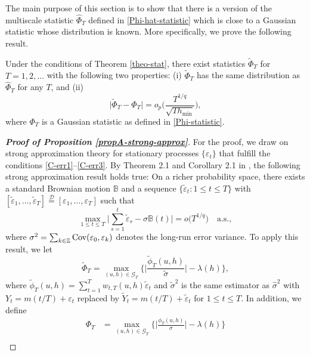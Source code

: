 \documentclass[a4paper,12pt]{article}
\numberwithin{equation}{section}
\begin{document}
The main purpose of this section is to show that there is a version of the multiscale statistic $\widehat{\Phi}_T$ defined in \eqref{Phi-hat-statistic} which is close to a Gaussian statistic whose distribution is known. More specifically, we prove the following result. 
%
%
\begin{propA}\label{propA-strong-approx}
Under the conditions of Theorem \ref{theo-stat}, there exist statistics $\widetilde{\Phi}_T$ for $T = 1,2,\ldots$ with the following two properties: (i) $\widetilde{\Phi}_T$ has the same distribution as $\widehat{\Phi}_T$ for any $T$, and (ii)
\[ \big| \widetilde{\Phi}_T - \Phi_T \big| = o_p \Big( \frac{T^{1/q}}{\sqrt{T h_{\min}}} \Big), \]
where $\Phi_T$ is a Gaussian statistic as defined in \eqref{Phi-statistic}. 
\end{propA}
%
%
\begin{proof}[\textnormal{\textbf{Proof of Proposition \ref{propA-strong-approx}}}] 
For the proof, we draw on strong approximation theory for stationary processes $\{\varepsilon_t\}$ that fulfill the conditions \ref{C-err1}--\ref{C-err3}. By Theorem 2.1 and Corollary 2.1 in \cite{BerkesLiuWu2014}, the following strong approximation result holds true: On a richer probability space, there exists a standard Brownian motion $\mathbb{B}$ and a sequence $\{ \widetilde{\varepsilon}_t: 1 \le t \le T \}$ with $[\widetilde{\varepsilon}_1,\ldots,\widetilde{\varepsilon}_T] \stackrel{\mathcal{D}}{=} [\varepsilon_1,\ldots,\varepsilon_T]$ such that 
\begin{equation}\label{eq-strongapprox-dep}
\max_{1 \le t \le T} \Big| \sum\limits_{s=1}^t \widetilde{\varepsilon}_s - \sigma \mathbb{B}(t) \Big| = o\big( T^{1/q} \big) \quad \text{a.s.},  
\end{equation}
where $\sigma^2 = \sum_{k \in \mathbb{Z}} \textnormal{Cov}(\varepsilon_0, \varepsilon_k)$ denotes the long-run error variance. To apply this result, we let 
\[ \widetilde{\Phi}_T = \max_{(u,h) \in \mathcal{G}_T} \Big\{ \Big|\frac{\widetilde{\phi}_T(u,h)}{\widetilde{\sigma}}\Big| - \lambda(h) \Big\}, \]
where $\widetilde{\phi}_T(u,h) = \sum\nolimits_{t=1}^T w_{t,T}(u,h) \widetilde{\varepsilon}_t$ and $\widetilde{\sigma}^2$ is the same estimator as $\widehat{\sigma}^2$ with $Y_t = m(t/T) + \varepsilon_t$ replaced by $\widetilde{Y}_t = m(t/T) + \widetilde{\varepsilon}_t$ for $1 \le t \le T$. In addition, we define
\begin{align*}
\Phi_T & = \max_{(u,h) \in \mathcal{G}_T} \Big\{ \Big|\frac{\phi_T(u,h)}{\sigma}\Big| - \lambda(h) \Big\} \\

\end{align*}
\end{proof}
\end{document}
